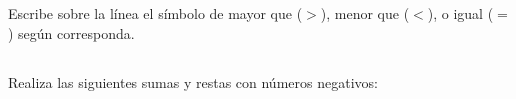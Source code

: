 \documentclass[12pt,addpoints]{evalua}
\begin{document}
\begin{questions}
\begin{multicols}{2}
      \end{multicols}


      \subsection*{\else{}\fi}
      \question[4] Escribe sobre la línea el símbolo de mayor que ($>$), menor que ($<$), o igual ($=$) según corresponda.

      \begin{multicols}{2}
      \end{multicols}

      \subsection*{\else{}\fi}
      \question[4] Realiza las siguientes sumas y restas con números negativos:

      \begin{multicols}{2}
      \end{multicols}


\end{questions}
\end{document}
